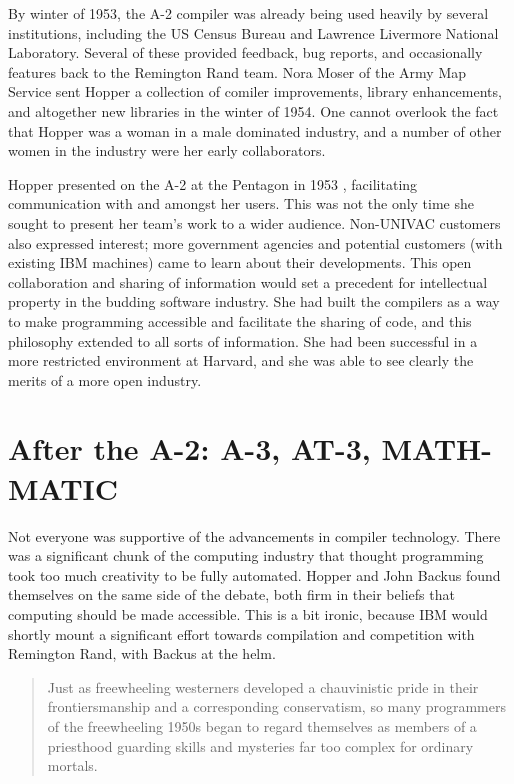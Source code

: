 By winter of 1953, the A-2 compiler was already being used heavily
by several institutions, including the US Census Bureau and
Lawrence Livermore National Laboratory.
Several of these provided feedback, bug reports, and occasionally features
back to the Remington Rand team.
Nora Moser of the Army Map Service sent Hopper a collection of comiler
improvements, library enhancements, and altogether new libraries in the
winter of 1954.
One cannot overlook the fact that Hopper was a woman in a male dominated
industry, and a number of other women in the industry were her early
collaborators.

Hopper presented on the A-2 at the Pentagon in 1953
\cite{pentagon_hopper_univac_workshop_1953},
facilitating communication with and amongst her users.
This was not the only time she sought to present her team's work
to a wider audience.
Non-UNIVAC customers also expressed interest; more government
agencies and potential customers (with existing IBM machines)
came to learn about their developments.
This open collaboration and sharing of information would set a precedent
for intellectual property in the budding software industry.
She had built the compilers as a way to make programming accessible
and facilitate the sharing of code, and this philosophy extended to
all sorts of information.
She had been successful in a more restricted environment at Harvard,
and she was able to see clearly the merits of a more open industry.

\section{After the A-2: A-3, AT-3, MATH-MATIC}


Not everyone was supportive of the advancements in compiler technology.
There was a significant chunk of the computing industry that thought
programming took too much creativity to be fully automated.
Hopper and John Backus found themselves on the same side of the debate,
both firm in their beliefs that computing should be made accessible.
This is a bit ironic, because IBM would shortly mount a significant effort
towards compilation and competition with Remington Rand, with Backus at the helm.

\begin{quotation}
    Just as freewheeling westerners developed a chauvinistic pride in their 
frontiersmanship and a corresponding conservatism, so many programmers of the 
freewheeling 1950s began to regard themselves as members of a priesthood 
guarding skills and mysteries far too complex for ordinary mortals.
\cite{Backus_1980_Programming_in_America_in_1950s}
\end{quotation}

